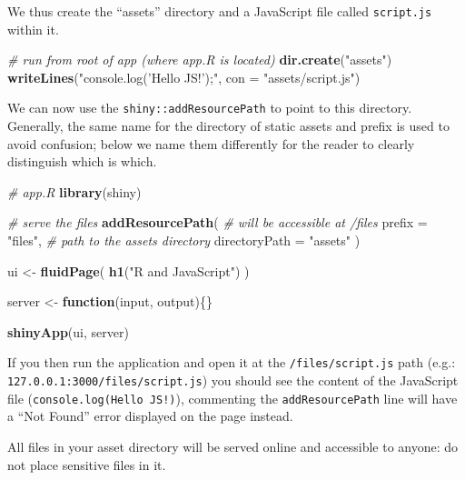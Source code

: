 \documentclass[10pt,]{krantz}
\makeatletter
\newenvironment{Shaded}{\begin{snugshade}}{\end{snugshade}}
\newcommand{\CommentTok}[1]{\textcolor[rgb]{0.37,0.37,0.37}{\textit{#1}}}
\newcommand{\ControlFlowTok}[1]{\textcolor[rgb]{0.27,0.27,0.27}{\textbf{#1}}}
\newcommand{\DataTypeTok}[1]{\textcolor[rgb]{0.27,0.27,0.27}{#1}}
\newcommand{\KeywordTok}[1]{\textcolor[rgb]{0.27,0.27,0.27}{\textbf{#1}}}
\newcommand{\NormalTok}[1]{#1}
\newcommand{\StringTok}[1]{\textcolor[rgb]{0.5,0.5,0.5}{#1}}
\newenvironment{kframe}{%
\medskip{}
\setlength{\fboxsep}{.8em}
 \def\at@end@of@kframe{}%
 \ifinner\ifhmode%
  \def\at@end@of@kframe{\end{minipage}}%
  \begin{minipage}{\columnwidth}%
 \fi\fi%
 \def\FrameCommand##1{\hskip\@totalleftmargin \hskip-\fboxsep
 \colorbox{shadecolor}{##1}\hskip-\fboxsep
     \hskip-\linewidth \hskip-\@totalleftmargin \hskip\columnwidth}%
 \MakeFramed {\advance\hsize-\width
   \@totalleftmargin\z@ \linewidth\hsize
   \@setminipage}}%
 {\par\unskip\endMakeFramed%
 \at@end@of@kframe}
\renewenvironment{Shaded}{\begin{kframe}}{\end{kframe}}
\newenvironment{rmdblock}[1]
  {
  \begin{itemize}
  \renewcommand{\labelitemi}{
    \raisebox{-.7\height}[0pt][0pt]{
      {\setkeys{Gin}{width=3em,keepaspectratio}\texttt{[image: images/\#1]}}
    }
  }
  \setlength{\fboxsep}{1em}
  \begin{kframe}
  \item
  }
  {
  \end{kframe}
  \end{itemize}
  }
\newenvironment{rmdnote}
  {\begin{rmdblock}{note}}
  {\end{rmdblock}}
\makeatother
\begin{document}
We thus create the ``assets'' directory and a JavaScript file called \texttt{script.js} within it.

\begin{Shaded}
\begin{Highlighting}[]
\CommentTok{# run from root of app (where app.R is located)}
\KeywordTok{dir.create}\NormalTok{(}\StringTok{"assets"}\NormalTok{)}
\KeywordTok{writeLines}\NormalTok{(}\StringTok{"console.log('Hello JS!');"}\NormalTok{, }\DataTypeTok{con =} \StringTok{"assets/script.js"}\NormalTok{)}
\end{Highlighting}
\end{Shaded}

We can now use the \texttt{shiny::addResourcePath} to point to this directory. Generally, the same name for the directory of static assets and prefix is used to avoid confusion; below we name them differently for the reader to clearly distinguish which is which.

\begin{Shaded}
\begin{Highlighting}[]
\CommentTok{# app.R}
\KeywordTok{library}\NormalTok{(shiny)}

\CommentTok{# serve the files}
\KeywordTok{addResourcePath}\NormalTok{(}
  \CommentTok{# will be accessible at /files}
  \DataTypeTok{prefix =} \StringTok{"files"}\NormalTok{, }
  \CommentTok{# path to the assets directory}
  \DataTypeTok{directoryPath =} \StringTok{"assets"}
\NormalTok{)}

\NormalTok{ui <-}\StringTok{ }\KeywordTok{fluidPage}\NormalTok{(}
  \KeywordTok{h1}\NormalTok{(}\StringTok{"R and JavaScript"}\NormalTok{)}
\NormalTok{)}

\NormalTok{server <-}\StringTok{ }\ControlFlowTok{function}\NormalTok{(input, output)\{\}}

\KeywordTok{shinyApp}\NormalTok{(ui, server)}
\end{Highlighting}
\end{Shaded}

If you then run the application and open it at the \texttt{/files/script.js} path (e.g.: \texttt{127.0.0.1:3000/files/script.js}) you should see the content of the JavaScript file (\texttt{console.log(\textquotesingle{}Hello\ JS!\textquotesingle{})}), commenting the \texttt{addResourcePath} line will have a ``Not Found'' error displayed on the page instead.

\begin{rmdnote}
All files in your asset directory will be served online and accessible
to anyone: do not place sensitive files in it.
\end{rmdnote}
\end{document}
